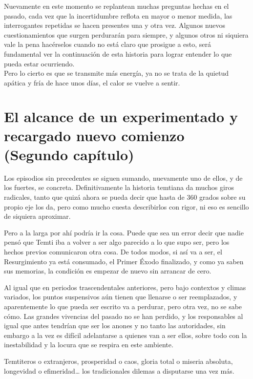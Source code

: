 \documentclass[
  spanish,
]{book}
\begin{document}
Nuevamente en este momento se replantean muchas preguntas hechas en el pasado, cada vez que la incertidumbre reflota en mayor o menor medida, las interrogantes repetidas se hacen presentes una y otra vez. Algunos nuevos cuestionamientos que surgen perdurarán para siempre, y algunos otros ni siquiera vale la pena hacérselos cuando no está claro que prosigue a esto, será fundamental ver la continuación de esta historia para lograr entender lo que pueda estar ocurriendo.\\
Pero lo cierto es que se transmite más energía, ya no se trata de la quietud apática y fría de hace unos días, el calor se vuelve a sentir.

\hypertarget{el-alcance-de-un-experimentado-y-recargado-nuevo-comienzo-segundo-capuxedtulo}{%
\chapter{El alcance de un experimentado y recargado nuevo comienzo (Segundo capítulo)}\label{el-alcance-de-un-experimentado-y-recargado-nuevo-comienzo-segundo-capuxedtulo}}

Los episodios sin precedentes se siguen sumando, nuevamente uno de ellos, y de los fuertes, se concreta. Definitivamente la historia temtiana da muchos giros radicales, tanto que quizá ahora se pueda decir que hasta de 360 grados sobre su propio eje los da, pero como mucho cuesta describirlos con rigor, ni eso es sencillo de siquiera aproximar.

Pero a la larga por ahí podría ir la cosa. Puede que sea un error decir que nadie pensó que Temti iba a volver a ser algo parecido a lo que supo ser, pero los hechos previos comunicaron otra cosa. De todos modos, si así va a ser, el Resurgimiento ya está consumado, el Primer Éxodo finalizado, y como ya saben sus memorias, la condición es empezar de nuevo sin arrancar de cero.

Al igual que en periodos trascendentales anteriores, pero bajo contextos y climas variados, los puntos suspensivos aún tienen que llenarse o ser reemplazados, y aparentemente lo que pueda ser escrito va a perdurar, pero otra vez, no se sabe cómo. Las grandes vivencias del pasado no se han perdido, y los responsables al igual que antes tendrían que ser los anones y no tanto las autoridades, sin embargo a la vez es difícil adelantarse a quienes van a ser ellos, sobre todo con la inestabilidad y la locura que se respira en este ambiente.

Temtiteros o extranjeros, prosperidad o caos, gloria total o miseria absoluta, longevidad o efimeridad\ldots{} los tradicionales dilemas a disputarse una vez más.
\end{document}

